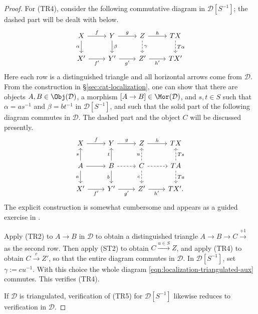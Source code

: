 \begin{proof}
	For (TR4), consider the following commutative diagram in
	$\mathcal{D}[S^{-1}]$; the dashed part will be dealt with below.
	\begin{equation}\label{eqn:localization-triangulated-aux}\begin{tikzcd}
		X \arrow[r, "f"] \arrow[d, "\alpha"'] & Y \arrow[r, "g"] \arrow[d, "\beta"] & Z \arrow[r, "h"] \arrow[dashed, d, "\gamma"] & TX \arrow[dashed, d, "T\alpha"] \\
		X' \arrow[r, "{f'}"'] & Y' \arrow[r, "{g'}"'] & Z' \arrow[r, "{h'}"'] & T X'
	\end{tikzcd}\end{equation}
	Here each row is a distinguished triangle and all horizontal arrows come
	from $\mathcal{D}$. From the construction in
	\S\ref{sec:cat-localization}, one can show that there are objects
	$A, B \in \Obj(\mathcal{D})$, a morphism
	$[A \to B] \in \Mor(\mathcal{D})$, and $s, t \in S$ such that
	$\alpha = as^{-1}$ and $\beta = bt^{-1}$ in
	$\mathcal{D}[S^{-1}]$, and such that the solid part of the following
	diagram commutes in $\mathcal{D}$. The dashed part and the object $C$
	will be discussed presently.
	\[\begin{tikzcd}
		X \arrow[r, "f"] & Y \arrow[r, "g"] & Z \arrow[r, "h"] & TX \\
		A \arrow[u, "s"] \arrow[d, "a"'] \arrow[r] & B \arrow[u, "t"] \arrow[d, "b"'] \arrow[dashed, r] & C \arrow[dashed, u, "u"] \arrow[dashed, r] \arrow[dashed, d, "c"'] & TA \arrow[dashed, u, "Ts"'] \arrow[dashed, d, "Ta"] \\
		X' \arrow[r, "{f'}"'] & Y' \arrow[r, "{g'}"'] & Z' \arrow[r, "{h'}"'] & T X' .
	\end{tikzcd}\]
	The explicit construction is somewhat cumbersome and appears as a guided
	exercise in .

	Apply (TR2) to $A \to B$ in $\mathcal{D}$ to obtain a distinguished
	triangle $A \to B \to C \xrightarrow{+1}$ as the second row. Then apply
	(ST2) to obtain $C \xrightarrow{u \in S} Z$, and apply (TR4) to obtain
	$C \xrightarrow{c} Z'$, so that the entire diagram commutes in
	$\mathcal{D}$. In $\mathcal{D}[S^{-1}]$, set $\gamma := c u^{-1}$.
	With this choice the whole diagram
	\eqref{eqn:localization-triangulated-aux} commutes. This verifies (TR4).
	
	If $\mathcal{D}$ is triangulated, verification of (TR5) for
	$\mathcal{D}[S^{-1}]$ likewise reduces to verification in $\mathcal{D}$.
\end{proof}
